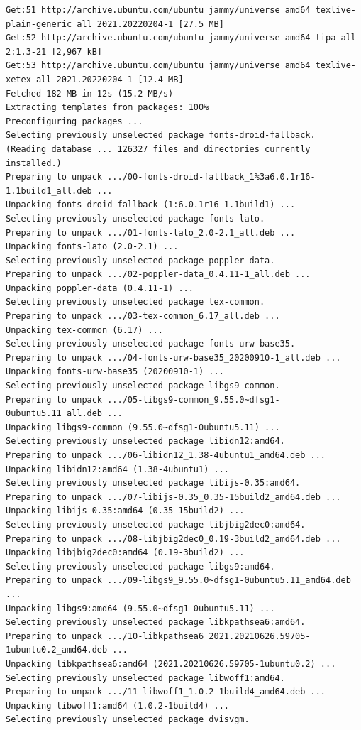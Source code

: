 \documentclass[
  11pt,
  letterpaper,
]{book}
\begin{document}
\begin{verbatim}
Get:51 http://archive.ubuntu.com/ubuntu jammy/universe amd64 texlive-plain-generic all 2021.20220204-1 [27.5 MB]
Get:52 http://archive.ubuntu.com/ubuntu jammy/universe amd64 tipa all 2:1.3-21 [2,967 kB]
Get:53 http://archive.ubuntu.com/ubuntu jammy/universe amd64 texlive-xetex all 2021.20220204-1 [12.4 MB]
Fetched 182 MB in 12s (15.2 MB/s)
Extracting templates from packages: 100%
Preconfiguring packages ...
Selecting previously unselected package fonts-droid-fallback.
(Reading database ... 126327 files and directories currently installed.)
Preparing to unpack .../00-fonts-droid-fallback_1%3a6.0.1r16-1.1build1_all.deb ...
Unpacking fonts-droid-fallback (1:6.0.1r16-1.1build1) ...
Selecting previously unselected package fonts-lato.
Preparing to unpack .../01-fonts-lato_2.0-2.1_all.deb ...
Unpacking fonts-lato (2.0-2.1) ...
Selecting previously unselected package poppler-data.
Preparing to unpack .../02-poppler-data_0.4.11-1_all.deb ...
Unpacking poppler-data (0.4.11-1) ...
Selecting previously unselected package tex-common.
Preparing to unpack .../03-tex-common_6.17_all.deb ...
Unpacking tex-common (6.17) ...
Selecting previously unselected package fonts-urw-base35.
Preparing to unpack .../04-fonts-urw-base35_20200910-1_all.deb ...
Unpacking fonts-urw-base35 (20200910-1) ...
Selecting previously unselected package libgs9-common.
Preparing to unpack .../05-libgs9-common_9.55.0~dfsg1-0ubuntu5.11_all.deb ...
Unpacking libgs9-common (9.55.0~dfsg1-0ubuntu5.11) ...
Selecting previously unselected package libidn12:amd64.
Preparing to unpack .../06-libidn12_1.38-4ubuntu1_amd64.deb ...
Unpacking libidn12:amd64 (1.38-4ubuntu1) ...
Selecting previously unselected package libijs-0.35:amd64.
Preparing to unpack .../07-libijs-0.35_0.35-15build2_amd64.deb ...
Unpacking libijs-0.35:amd64 (0.35-15build2) ...
Selecting previously unselected package libjbig2dec0:amd64.
Preparing to unpack .../08-libjbig2dec0_0.19-3build2_amd64.deb ...
Unpacking libjbig2dec0:amd64 (0.19-3build2) ...
Selecting previously unselected package libgs9:amd64.
Preparing to unpack .../09-libgs9_9.55.0~dfsg1-0ubuntu5.11_amd64.deb ...
Unpacking libgs9:amd64 (9.55.0~dfsg1-0ubuntu5.11) ...
Selecting previously unselected package libkpathsea6:amd64.
Preparing to unpack .../10-libkpathsea6_2021.20210626.59705-1ubuntu0.2_amd64.deb ...
Unpacking libkpathsea6:amd64 (2021.20210626.59705-1ubuntu0.2) ...
Selecting previously unselected package libwoff1:amd64.
Preparing to unpack .../11-libwoff1_1.0.2-1build4_amd64.deb ...
Unpacking libwoff1:amd64 (1.0.2-1build4) ...
Selecting previously unselected package dvisvgm.

\end{verbatim}
\end{document}
